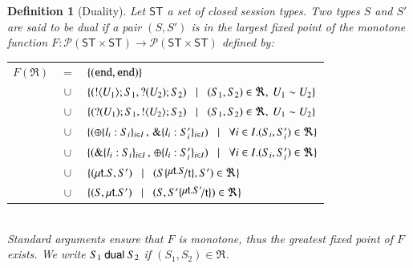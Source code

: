 \documentclass[preprint,11pt]{elsarticle}
\newtheorem{definition}{Definition}[section]
\begin{document}
{\begin{definition}[Duality]
\label{def:dual}
Let $\mathsf{ST}$ a set of closed session types. 
Two types $S$ and $S'$ are said to be {\em dual} if a pair $(S,S')$ is 
in the largest fixed point of the monotone function
$F:\mathcal{P}(\mathsf{ST}\times \mathsf{ST}) \to 
\mathcal{P}(\mathsf{ST}\times \mathsf{ST})$ defined by:\\[1mm]
\begin{tabular}{rcl}
$F(\Re)$ &$\!\!=\!\!$&	$\{(\mathtt{end}, \mathtt{end})\}$\\
         &$\!\!\cup\!\!$&	$\{(! \langle U_1 \rangle ; S_1, ? (U_2) ; S_2)
\;\;\;|\;\;\;(S_1, S_2)\in \Re, \  U_1 \sim U_2 \}$\\ 
       &$\!\!\cup\!\!$&	$\{(? (U_1) ; S_1, ! \langle U_2 \rangle ; S_2)
\;\;\;|\;\;\;(S_1, S_2)\in \Re, \ U_1 \sim U_2\}$\\ 
	&$\!\!\cup\!\!$&	$\{(\oplus \{l_i: S_i\}_{i \in I} \,,\, \& \{l_i: S_i'\}_{i \in I}) \;\;\;|\;\;\; \forall i\in I. (S_i, S_i')\in \Re\}$\\
	&$\!\!\cup\!\!$&	$\{(\& \{l_i: S_i\}_{i \in I}\,,\, \oplus \{l_i: S_i'\}_{i \in I}) \;\;\;|\;\;\; \forall i\in I. (S_i, S_i')\in \Re\}$\\
	&$\!\!\cup\!\!$&	$\set{(\trec{t}{S}, S')
\bnfbar (S\subst{\trec{t}{S}}{\vart{t}},S')\in \Re}$\\
	&$\!\!\cup\!\!$&	$\set{(S,\trec{t}{S'})
\bnfbar (S,S'\subst{\trec{t}{S'}}{\vart{t}})\in \Re}$\\[1mm]
\end{tabular}
\\
\noindent
Standard arguments ensure that $F$ is monotone, thus the greatest fixed point
of $F$ exists. We write $S_1 \ \mathsf{dual}\  S_2$ if  $(S_1,S_2)\in \Re$. 
\end{definition}



}
\end{document}
